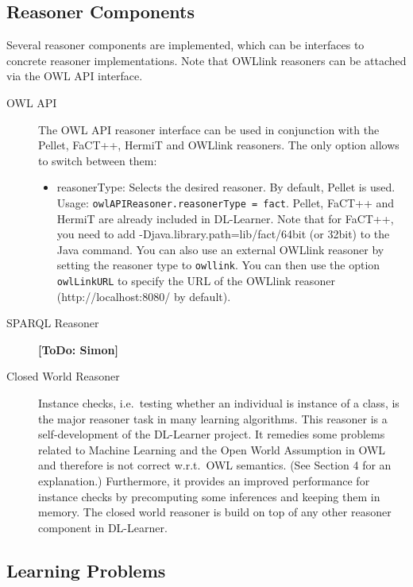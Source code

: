 \documentclass[a4paper,12pt]{scrartcl}
\newcommand{\todo}[1]{\textbf{[ToDo: #1]}}
\begin{document}
\subsection{Reasoner Components}

Several reasoner components are implemented, which can be interfaces to concrete reasoner implementations. 
Note that OWLlink reasoners can be attached via the OWL API interface.

\begin{description}
 \item[OWL API] The OWL API reasoner interface can be used in conjunction with the Pellet, FaCT++, HermiT and OWLlink reasoners. The only option allows to switch between them:
 \begin{itemize}
  \item reasonerType: Selects the desired reasoner. By default, Pellet is used. Usage: \verb|owlAPIReasoner.reasonerType = fact|. Pellet, FaCT++ and HermiT are already included in DL-Learner. Note that for FaCT++, you need to add -Djava.library.path=lib/fact/64bit (or 32bit) to the Java command. You can also use an external OWLlink reasoner by setting the reasoner type to \verb|owllink|. You can then use the option \verb|owlLinkURL| to specify the URL of the OWLlink reasoner (http://localhost:8080/ by default).
 \end{itemize}
 \item[SPARQL Reasoner] \todo{Simon}
 \item[Closed World Reasoner] Instance checks, i.e.~testing whether an individual is instance of a class, is the major reasoner task in many learning algorithms. This reasoner is a self-development of the DL-Learner project. It remedies some problems related to Machine Learning and the Open World Assumption in OWL and therefore is not correct w.r.t.~OWL semantics. (See \cite{cheng00} Section 4 for an explanation.) Furthermore, it provides an improved performance for instance checks by precomputing some inferences and keeping them in memory. The closed world reasoner is build on top of any other reasoner component in DL-Learner.
\end{description}

\subsection{Learning Problems}
\end{document}
